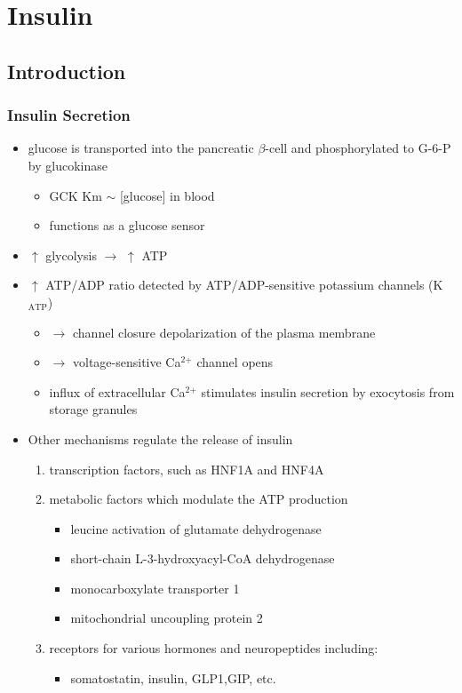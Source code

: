 \documentclass{scrartcl}
\begin{document}
\section{Insulin}
\label{sec:orga28a46e}
\subsection{Introduction}
\label{sec:org397de79}
\subsubsection{Insulin Secretion}
\label{sec:org80997ec}
\begin{itemize}
\item glucose is transported into the pancreatic \(\beta\)-cell and phosphorylated to G-6-P by glucokinase
\begin{itemize}
\item GCK Km \(\sim\) [glucose] in  blood
\item functions as a glucose sensor
\end{itemize}
\item \(\uparrow\) glycolysis \(\to\) \(\uparrow\) ATP
\item \(\uparrow\) ATP/ADP ratio detected by ATP/ADP-sensitive potassium channels (K\(_{\text{ATP}}\))
\begin{itemize}
\item \(\to\) channel closure depolarization of the plasma membrane
\item \(\to\) voltage-sensitive Ca\(^{\text{2+}}\) channel opens
\item influx of extracellular Ca\(^{\text{2+}}\) stimulates insulin secretion by
exocytosis from storage granules
\end{itemize}

\item Other mechanisms regulate the release of insulin
\begin{enumerate}
\item transcription factors, such as HNF1A and HNF4A

\item metabolic factors which modulate the ATP production
\begin{itemize}
\item leucine activation of glutamate dehydrogenase
\item short-chain L-3-hydroxyacyl-CoA dehydrogenase
\item monocarboxylate transporter 1
\item mitochondrial uncoupling protein 2
\end{itemize}
\item receptors for various hormones and neuropeptides including:
\begin{itemize}
\item somatostatin, insulin, GLP1,GIP, etc.
\end{itemize}
\end{enumerate}
\end{itemize}
\end{document}
